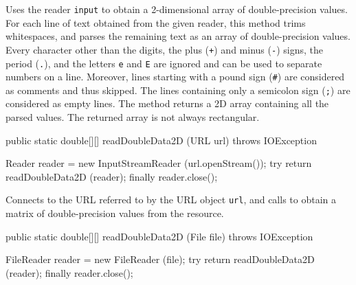 \begin{tabb}   Uses the reader \texttt{input} to obtain
 a 2-dimensional array of double-precision values.
 For each line of text obtained from the
 given reader, this method
 trims whitespaces, and parses the
 remaining text as an array of double-precision values.
 Every character
 other than the digits, the plus (\texttt{+}) and minus (\texttt{-}) signs,
 the period (\texttt{.}),
 and the letters \texttt{e} and \texttt{E} are
 ignored and can be used to separate
 numbers on a line.
 Moreover, lines starting with a pound sign (\texttt{\#})
 are considered as comments and thus skipped. The lines
 containing only a semicolon sign (\texttt{;}) are considered
 as empty lines.
 The method returns a 2D array containing
 all the parsed values.
 The returned array is not always rectangular.
\end{tabb}
\begin{htmlonly}
\end{htmlonly}
\begin{code}

   public static double[][] readDoubleData2D (URL url) throws IOException\begin{hide} {
      Reader reader = new InputStreamReader (url.openStream());
      try {
         return readDoubleData2D (reader);
      }
      finally {
         reader.close();
      }
   }\end{hide}
\end{code}
\begin{tabb}   Connects to the URL referred to by the URL object \texttt{url},
 and calls  to
 obtain a matrix of double-precision values from
 the resource.
\end{tabb}
\begin{htmlonly}
\end{htmlonly}
\begin{code}

   public static double[][] readDoubleData2D (File file) throws IOException\begin{hide} {
      FileReader reader = new FileReader (file);
      try {
         return readDoubleData2D (reader);
      }
      finally {
         reader.close();
      }
   }\end{hide}
\end{code}
